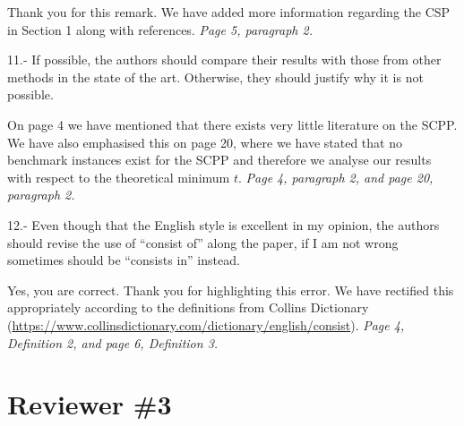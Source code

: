 \documentclass[a4paper,11pt]{article}
\newcommand{\intro}[1]{{\color{myOrange}#1}}
\newcommand{\ea}[1]{{\color{myRed}#1}}
\newcommand{\note}[1]{{\color{myDarkBlue2}#1}}
\newcommand{\other}[1]{{\color{myPurple1}#1}}
\newcommand{\resp}[1]{{\color{myDarkBlue2}#1}} %
\begin{document}

\resp{Thank you for this remark. We have added more information regarding the CSP in Section 1 along with references. \textit{Page 5, paragraph 2.}}


11.- If possible, the authors should compare their results with those from other methods in the state of the art. Otherwise, they should justify why it is not possible.


\resp{On page 4 we have mentioned that there exists very little literature on the SCPP. We have also emphasised this on page 20, where we have stated that no benchmark instances exist for the SCPP and therefore we analyse our results with respect to the theoretical minimum $t$. \textit{Page 4, paragraph 2, and page 20, paragraph 2.}}


12.- Even though that the English style is excellent in my opinion, the authors should revise the use of ``consist of'' along the paper, if I am not wrong sometimes should be ``consists in'' instead.


\resp{Yes, you are correct. Thank you for highlighting this error. We have rectified this appropriately according to the definitions from Collins Dictionary (\url{https://www.collinsdictionary.com/dictionary/english/consist}). \textit{Page 4, Definition 2, and page 6, Definition 3.}}



\section*{Reviewer \#3}
\end{document}

